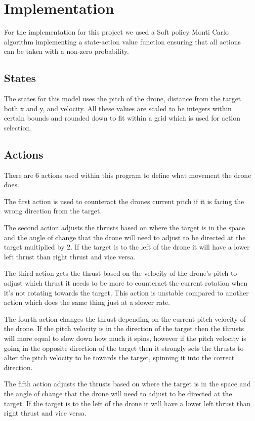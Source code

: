 \section{Implementation}
For the implementation for this project we used a Soft policy Monti Carlo algorithm implementing a state-action value function ensuring that all actions can be taken with a non-zero probability. 

\subsection{States}
The states for this model uses the pitch of the drone, distance from the target both x and y, and velocity. All these values are scaled to be integers within certain bounds and rounded down to fit within a grid which is used for action selection.  

\subsection{Actions}
There are 6 actions used within this program to define what movement the drone does.

The first action is used to counteract the drones current pitch if it is facing the wrong direction from the target. 

The second action adjusts the thrusts based on where the target is in the space and the angle of change that the drone will need to adjust to be directed at the target multiplied by 2. If the target is to the left of the drone it will have a lower left thrust than right thrust and vice versa. 

The third action gets the thrust based on the velocity of the drone's pitch to adjust which thrust it needs to be more to counteract the current rotation when it’s not rotating towards the target. This action is unstable compared to another action which does the same thing just at a slower rate.

The fourth action changes the thrust depending on the current pitch velocity of the drone. If the pitch velocity is in the direction of the target then the thrusts will more equal to slow down how much it spins, however if the pitch velocity is going in the opposite direction of the target then it strongly sets the thrusts to alter the pitch velocity to be towards the target, spinning it into the correct direction.

The fifth action adjusts the thrusts based on where the target is in the space and the angle of change that the drone will need to adjust to be directed at the target. If the target is to the left of the drone it will have a lower left thrust than right thrust and vice versa. 

